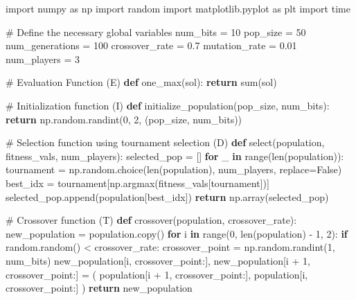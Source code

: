 \documentclass[
  letterpaper,
  DIV=11,
  numbers=noendperiod]{scrreprt}
\newenvironment{Shaded}{\begin{snugshade}}{\end{snugshade}}
\newcommand{\BuiltInTok}[1]{\textcolor[rgb]{0.00,0.23,0.31}{#1}}
\newcommand{\CommentTok}[1]{\textcolor[rgb]{0.37,0.37,0.37}{#1}}
\newcommand{\ControlFlowTok}[1]{\textcolor[rgb]{0.00,0.23,0.31}{\textbf{#1}}}
\newcommand{\DecValTok}[1]{\textcolor[rgb]{0.68,0.00,0.00}{#1}}
\newcommand{\FloatTok}[1]{\textcolor[rgb]{0.68,0.00,0.00}{#1}}
\newcommand{\ImportTok}[1]{\textcolor[rgb]{0.00,0.46,0.62}{#1}}
\newcommand{\KeywordTok}[1]{\textcolor[rgb]{0.00,0.23,0.31}{\textbf{#1}}}
\newcommand{\NormalTok}[1]{\textcolor[rgb]{0.00,0.23,0.31}{#1}}
\newcommand{\OperatorTok}[1]{\textcolor[rgb]{0.37,0.37,0.37}{#1}}
\newcommand{\VariableTok}[1]{\textcolor[rgb]{0.07,0.07,0.07}{#1}}
\begin{document}
\begin{Shaded}
\begin{Highlighting}[]
\ImportTok{import}\NormalTok{ numpy }\ImportTok{as}\NormalTok{ np}
\ImportTok{import}\NormalTok{ random}
\ImportTok{import}\NormalTok{ matplotlib.pyplot }\ImportTok{as}\NormalTok{ plt}
\ImportTok{import}\NormalTok{ time}

\CommentTok{\# Define the necessary global variables}
\NormalTok{num\_bits }\OperatorTok{=} \DecValTok{10}
\NormalTok{pop\_size }\OperatorTok{=} \DecValTok{50}
\NormalTok{num\_generations }\OperatorTok{=} \DecValTok{100}
\NormalTok{crossover\_rate }\OperatorTok{=} \FloatTok{0.7}
\NormalTok{mutation\_rate }\OperatorTok{=} \FloatTok{0.01}
\NormalTok{num\_players }\OperatorTok{=} \DecValTok{3}  

\CommentTok{\# Evaluation Function (E)}
\KeywordTok{def}\NormalTok{ one\_max(sol):}
    \ControlFlowTok{return} \BuiltInTok{sum}\NormalTok{(sol)}

\CommentTok{\# Initialization function (I)}
\KeywordTok{def}\NormalTok{ initialize\_population(pop\_size, num\_bits):}
    \ControlFlowTok{return}\NormalTok{ np.random.randint(}\DecValTok{0}\NormalTok{, }\DecValTok{2}\NormalTok{, (pop\_size, num\_bits))}

\CommentTok{\# Selection function using tournament selection (D)}
\KeywordTok{def}\NormalTok{ select(population, fitness\_vals, num\_players):}
\NormalTok{    selected\_pop }\OperatorTok{=}\NormalTok{ []}
    \ControlFlowTok{for}\NormalTok{ \_ }\KeywordTok{in} \BuiltInTok{range}\NormalTok{(}\BuiltInTok{len}\NormalTok{(population)):}
\NormalTok{        tournament }\OperatorTok{=}\NormalTok{ np.random.choice(}\BuiltInTok{len}\NormalTok{(population), num\_players, replace}\OperatorTok{=}\VariableTok{False}\NormalTok{)}
\NormalTok{        best\_idx }\OperatorTok{=}\NormalTok{ tournament[np.argmax(fitness\_vals[tournament])]}
\NormalTok{        selected\_pop.append(population[best\_idx])}
    \ControlFlowTok{return}\NormalTok{ np.array(selected\_pop)}

\CommentTok{\# Crossover function (T)}
\KeywordTok{def}\NormalTok{ crossover(population, crossover\_rate):}
\NormalTok{    new\_population }\OperatorTok{=}\NormalTok{ population.copy()}
    \ControlFlowTok{for}\NormalTok{ i }\KeywordTok{in} \BuiltInTok{range}\NormalTok{(}\DecValTok{0}\NormalTok{, }\BuiltInTok{len}\NormalTok{(population) }\OperatorTok{{-}} \DecValTok{1}\NormalTok{, }\DecValTok{2}\NormalTok{):}
        \ControlFlowTok{if}\NormalTok{ random.random() }\OperatorTok{\textless{}}\NormalTok{ crossover\_rate:}
\NormalTok{            crossover\_point }\OperatorTok{=}\NormalTok{ np.random.randint(}\DecValTok{1}\NormalTok{, num\_bits)}
\NormalTok{            new\_population[i, crossover\_point:], new\_population[i }\OperatorTok{+} \DecValTok{1}\NormalTok{, crossover\_point:] }\OperatorTok{=}\NormalTok{ (}
\NormalTok{                population[i }\OperatorTok{+} \DecValTok{1}\NormalTok{, crossover\_point:], }
\NormalTok{                population[i, crossover\_point:]}
\NormalTok{            )}
    \ControlFlowTok{return}\NormalTok{ new\_population}


\end{Highlighting}
\end{Shaded}
\end{document}
